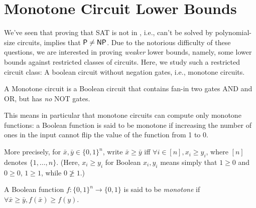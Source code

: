 %
%
%





\chapter{Monotone Circuit Lower Bounds}
\label{sec:Razborov} %



We've seen that proving that SAT is not in \Ppoly, i.e., can't be solved by polynomial-size circuits, implies that ${\mathsf{P}} \neq {\ensuremath{\mathsf{NP}}}$.
Due to the notorious difficulty of these questions, we are interested in proving \emph{weaker} lower bounds, namely, some lower bounds against restricted classes of circuits. 
Here, we study such a restricted circuit class: A boolean circuit without negation gates, i.e., monotone circuits.

\begin{definition}
A Monotone circuit is a Boolean circuit that contains fan-in two gates AND and OR, but has \emph{no} NOT gates.
\end{definition}

This means in particular that monotone circuits can compute only monotone functions: a Boolean function is said to be monotone if increasing the number of ones in the input cannot flip the value of the function from 1 to 0. 

More precisely, for $\bar{x}, \bar{y} \in\{0,1\}^n$, write $\bar{x} \geqslant \bar{y}$ iff $ \forall i \in [n], x_i \geqslant y_i$, where $[n]$ denotes $\{1,\dots,n\}$. (Here, $x_i\ge y_i$ for Boolean $x_i,y_i$ means simply that $1\ge 0$ and $0\ge 0$, $1\ge 1$, while $0\not\ge 1$.)

\begin{definition}
A Boolean function $f:\{0,1\}^n \rightarrow\{0,1\}$ is said to be  \emph{monotone} if $\forall \bar{x} \geq \bar{y}, f(\bar{x}) \geqslant f(y)$.
\end{definition}


